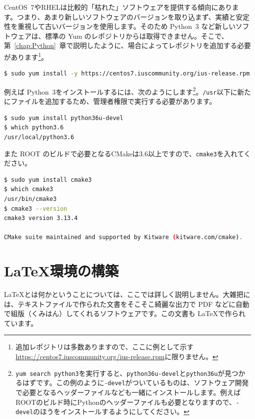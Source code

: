 CentOS~7やRHELは比較的「枯れた」ソフトウェアを提供する傾向にあります。つまり、あまり新しいソフトウェアのバージョンを取り込まず、実績と安定性を重視して古いバージョンを使用します。そのため Python~3 など新しいソフトウェアは、標準の Yum のレポジトリからは取得できません。そこで、第~\ref{chap:Python}~章で説明したように、場合によってレポジトリを追加する必要があります\footnote{追加レポジトリは多数ありますので、ここに例として示す\url{https://centos7.iuscommunity.org/ius-release.rpm}に限りません。}。

\begin{lstlisting}[language=bash]
$ sudo yum install -y https://centos7.iuscommunity.org/ius-release.rpm
\end{lstlisting}

例えば Python~3をインストールするには、次のようにします\footnote{\texttt{yum search python3}を実行すると、\texttt{python36u-devel}と\texttt{python36u}が見つかるはずです。この例のように\texttt{-devel}がついているものは、ソフトウェア開発で必要となるヘッダーファイルなども一緒にインストールします。例えばROOTのビルド時にPythonのヘッダーファイルも必要となりますので、\texttt{-devel}のほうをインストールするようにしてください。}。\texttt{/usr}以下に新たにファイルを追加するため、管理者権限で実行する必要があります。

\begin{lstlisting}[language=bash]
$ sudo yum install python36u-devel
$ which python3.6
/usr/local/python3.6
\end{lstlisting}

また ROOT のビルドで必要となるCMakeは3.6以上ですので、\texttt{cmake3}を入れてください。

\begin{lstlisting}[language=bash]
$ sudo yum install cmake3
$ which cmake3
/usr/bin/cmake3
$ cmake3 --version
cmake3 version 3.13.4

CMake suite maintained and supported by Kitware (kitware.com/cmake).
\end{lstlisting}

\chapter{\LaTeX 環境の構築}
\label{chap:LaTeX}

\LaTeX とは何かということについては、ここでは詳しく説明しません。大雑把には、テキストファイルで作られた文書をそこそこ綺麗な出力で PDF などに自動で組版（くみはん）してくれるソフトウェアです。この文書も \LaTeX で作られています。

